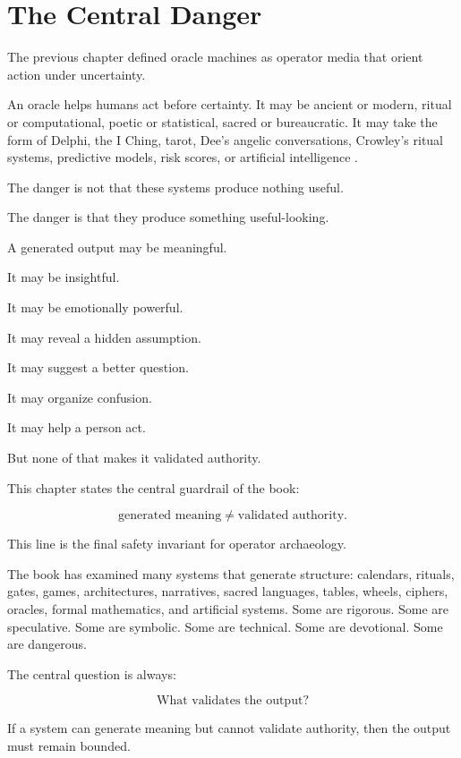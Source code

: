 \documentclass[11pt]{book}
\begin{document}
\section{The Central Danger}

The previous chapter defined oracle machines as operator media that orient action under uncertainty.

An oracle helps humans act before certainty. It may be ancient or modern, ritual or computational, poetic or statistical, sacred or bureaucratic. It may take the form of Delphi, the I Ching, tarot, Dee’s angelic conversations, Crowley’s ritual systems, predictive models, risk scores, or artificial intelligence \cite{Fontenrose1978DelphicOracle,WilhelmBaynes1967IChing,DeeCasaubon1659TrueFaithfulRelation,OConnor2016WeaponsMathDestruction,Cameron2026IPRP}.

The danger is not that these systems produce nothing useful.

The danger is that they produce something useful-looking.

A generated output may be meaningful.

It may be insightful.

It may be emotionally powerful.

It may reveal a hidden assumption.

It may suggest a better question.

It may organize confusion.

It may help a person act.

But none of that makes it validated authority.

This chapter states the central guardrail of the book:

\[
\text{generated meaning} \neq \text{validated authority}.
\]

This line is the final safety invariant for operator archaeology.

The book has examined many systems that generate structure: calendars, rituals, gates, games, architectures, narratives, sacred languages, tables, wheels, ciphers, oracles, formal mathematics, and artificial systems. Some are rigorous. Some are speculative. Some are symbolic. Some are technical. Some are devotional. Some are dangerous.

The central question is always:

\[
\text{What validates the output?}
\]

If a system can generate meaning but cannot validate authority, then the output must remain bounded.
\end{document}

